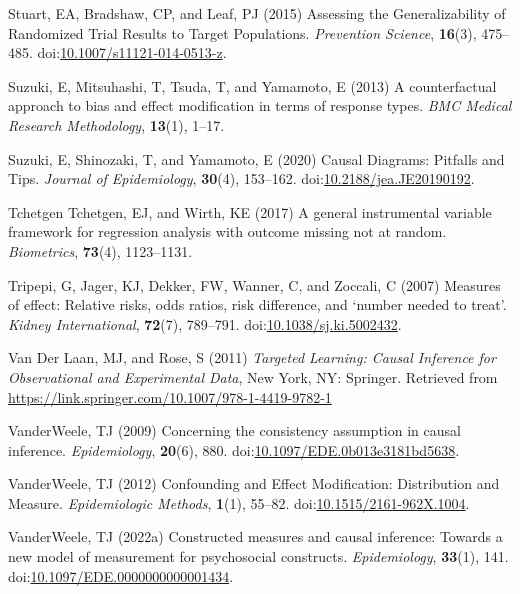 \documentclass[
  single column]{article}
\newlength{\cslhangindent}
\newenvironment{CSLReferences}[2] %
 {\begin{list}{}{%
  \setlength{\itemindent}{0pt}
  \setlength{\leftmargin}{0pt}
  \setlength{\parsep}{0pt}
  \ifodd #1
   \setlength{\leftmargin}{\cslhangindent}
   \setlength{\itemindent}{-1\cslhangindent}
  \fi
  \setlength{\itemsep}{#2\baselineskip}}}
 {\end{list}}
\begin{document}
\begin{CSLReferences}{1}{0}
Stuart, EA, Bradshaw, CP, and Leaf, PJ (2015) Assessing the
Generalizability of Randomized Trial Results to Target Populations.
\emph{Prevention Science}, \textbf{16}(3), 475--485.
doi:\href{https://doi.org/10.1007/s11121-014-0513-z}{10.1007/s11121-014-0513-z}.

Suzuki, E, Mitsuhashi, T, Tsuda, T, and Yamamoto, E (2013) A
counterfactual approach to bias and effect modification in terms of
response types. \emph{BMC Medical Research Methodology}, \textbf{13}(1),
1--17.

Suzuki, E, Shinozaki, T, and Yamamoto, E (2020) Causal Diagrams:
Pitfalls and Tips. \emph{Journal of Epidemiology}, \textbf{30}(4),
153--162.
doi:\href{https://doi.org/10.2188/jea.JE20190192}{10.2188/jea.JE20190192}.

Tchetgen Tchetgen, EJ, and Wirth, KE (2017) A general instrumental
variable framework for regression analysis with outcome missing not at
random. \emph{Biometrics}, \textbf{73}(4), 1123--1131.

Tripepi, G, Jager, KJ, Dekker, FW, Wanner, C, and Zoccali, C (2007)
Measures of effect: Relative risks, odds ratios, risk difference, and
{`}number needed to treat{'}. \emph{Kidney International},
\textbf{72}(7), 789--791.
doi:\href{https://doi.org/10.1038/sj.ki.5002432}{10.1038/sj.ki.5002432}.

Van Der Laan, MJ, and Rose, S (2011) \emph{Targeted Learning: Causal
Inference for Observational and Experimental Data}, New York, NY:
Springer. Retrieved from
\url{https://link.springer.com/10.1007/978-1-4419-9782-1}

VanderWeele, TJ (2009) Concerning the consistency assumption in causal
inference. \emph{Epidemiology}, \textbf{20}(6), 880.
doi:\href{https://doi.org/10.1097/EDE.0b013e3181bd5638}{10.1097/EDE.0b013e3181bd5638}.

VanderWeele, TJ (2012) Confounding and Effect Modification: Distribution
and Measure. \emph{Epidemiologic Methods}, \textbf{1}(1), 55--82.
doi:\href{https://doi.org/10.1515/2161-962X.1004}{10.1515/2161-962X.1004}.

VanderWeele, TJ (2022a) Constructed measures and causal inference:
Towards a new model of measurement for psychosocial constructs.
\emph{Epidemiology}, \textbf{33}(1), 141.
doi:\href{https://doi.org/10.1097/EDE.0000000000001434}{10.1097/EDE.0000000000001434}.


\end{CSLReferences}
\end{document}
